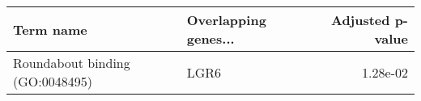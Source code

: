 \begin{tabular}{llr}
\toprule
                      Term name & Overlapping genes... &  Adjusted p-value \\
\midrule
Roundabout binding (GO:0048495) &                 LGR6 &          1.28e-02 \\
\bottomrule
\end{tabular}
